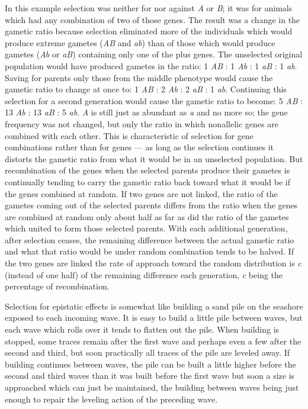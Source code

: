 \label{page136}
In this example selection was neither for nor against \textit{A} or
\textit{B}; it was for animals which had any combination of two of
those genes. The result was a change in the gametic ratio because
selection eliminated more of the individuals which would produce
extreme gametes (\textit{AB} and \textit{ab}) than of those which
would produce gametes (\textit{Ab} or \textit{aB}) containing only
one of the plus genes. The unselected original population would have
produced gametes in the ratio: 1 \textit{AB} : 1 \textit{Ab} : 1
\textit{aB} : 1 \textit{ab}. Saving for parents only those from the
middle phenotype would cause the gametic ratio to change at once to:
1 \textit{AB} : 2 \textit{Ab} : 2 \textit{aB} : 1 \textit{ab}. Continuing
this selection for a second generation would cause the gametic ratio to
become: 5 \textit{AB} : 13 \textit{Ab} : 13 \textit{aB} : 5 \textit{ab}.
\textit{A} is still just as abundant as \textit{a} and no more so; the
gene frequency was not changed, but only the ratio in which nonallelic genes
are combined with each other. This is characteristic of selection for gene
combinations rather than for genes --- as long as the selection continues it
distorts the gametic ratio from what it would be in an unselected population.
But recombination of the genes when the selected parents produce their gametes
is continually tending to carry the gametic ratio back toward what it would be
if the genes combined at random. If two genes are not linked, the ratio of the
gametes coming out of the selected parents differs from the ratio when the genes
are combined at random only about half as far as did the ratio of the gametes
which united to form those selected parents. With each additional generation,
after selection ceases, the remaining difference between the actual gametic ratio
and what that ratio would be under random combination tends to be halved. If the
two genes are linked the rate of approach toward the random distribution is
\textit{c} (instead of one half) of the remaining difference each generation,
\textit{c} being the percentage of recombination.

Selection for epistatic effects is somewhat like building a sand pile
on the seashore exposed to each incoming wave. It is easy to build a
little pile between waves, but each wave which rolls over it tends to flatten
out the pile. When building is stopped, some traces remain after the
first wave and perhaps even a few after the second and third, but soon
practically all traces of the pile are leveled away. If building continues
between waves, the pile can be built a little higher before the second
and third waves than it was built before the first wave but soon a size is
approached which can just be maintained, the building between waves
being just enough to repair the leveling action of the preceding wave.

